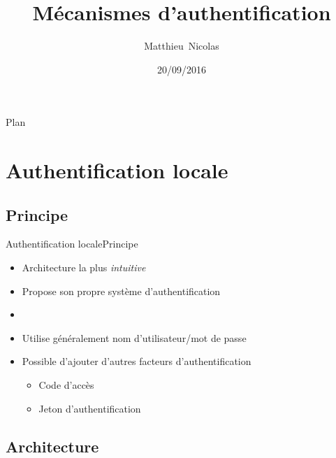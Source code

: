 \documentclass{beamer}
\title{Mécanismes d'authentification}
\subtitle{}
\author{Matthieu~Nicolas}
\date{20/09/2016}
\begin{document}
\begin{frame}
  \titlepage
\end{frame}

\begin{frame}{Plan}
  \tableofcontents
\end{frame}

\section{Authentification locale}

\subsection{Principe}

\begin{frame}{Authentification locale}{Principe}
  \begin{center}
    \begin{itemize}
      \item Architecture la plus \emph{intuitive}
      \item Propose son propre système d'authentification
      \item[~]
      \item Utilise généralement nom d'utilisateur/mot de passe
      \item Possible d'ajouter d'autres facteurs d'authentification
      \begin{itemize}
        \item Code d'accès
        \item Jeton d'authentification
      \end{itemize}
    \end{itemize}
  \end{center}
\end{frame}

\subsection{Architecture}
\end{document}
